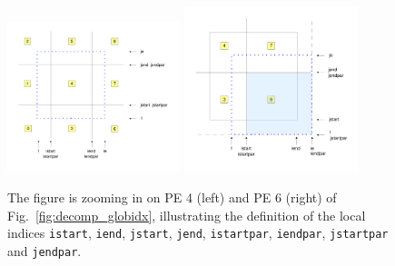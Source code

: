 \documentclass[11pt,twoside]{article}
\begin{document}
\begin{figure}
\begin{center} 
\includegraphics[width=0.45\textwidth]{MMDUM_halo_b.pdf} 
\includegraphics[width=0.45\textwidth]{MMDUM_halo_c.pdf} 
\end{center} 
\vspace{-.8cm}
\caption{The figure is zooming in on PE 4 (left) and PE 6 (right) of Fig.\ 
\ref{fig:decomp_globidx}, illustrating the definition of the local indices
{\tt istart}, {\tt iend}, {\tt jstart}, {\tt jend}, {\tt istartpar}, 
{\tt iendpar}, {\tt jstartpar} and {\tt jendpar}.}
\label{fig:decomp_locidx} 
\end{figure} 
\end{document}
